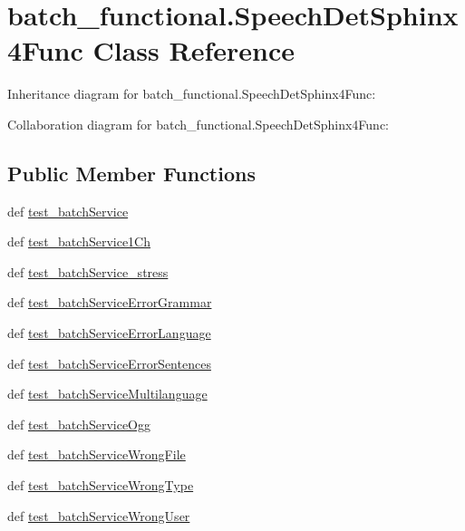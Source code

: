 \hypertarget{classbatch__functional_1_1SpeechDetSphinx4Func}{\section{batch\-\_\-functional.\-Speech\-Det\-Sphinx4\-Func Class Reference}
\label{classbatch__functional_1_1SpeechDetSphinx4Func}
}


Inheritance diagram for batch\-\_\-functional.\-Speech\-Det\-Sphinx4\-Func\-:


Collaboration diagram for batch\-\_\-functional.\-Speech\-Det\-Sphinx4\-Func\-:
\subsection*{Public Member Functions}
\begin{DoxyCompactItemize}
\item 
def \hyperlink{classbatch__functional_1_1SpeechDetSphinx4Func_a3c9455a650ec1a3d9a00633a77f8f3f5}{test\-\_\-batch\-Service}
\item 
def \hyperlink{classbatch__functional_1_1SpeechDetSphinx4Func_a316641ac7870ddb63490749b4792b590}{test\-\_\-batch\-Service1\-Ch}
\item 
def \hyperlink{classbatch__functional_1_1SpeechDetSphinx4Func_a4d12d3b504c8fc29e7c9b8e70cfeafeb}{test\-\_\-batch\-Service\-\_\-stress}
\item 
def \hyperlink{classbatch__functional_1_1SpeechDetSphinx4Func_a0c6afe405631c51df8d4a77b1dcb7948}{test\-\_\-batch\-Service\-Error\-Grammar}
\item 
def \hyperlink{classbatch__functional_1_1SpeechDetSphinx4Func_a6f945f6044e7ea87104b09ff78246c92}{test\-\_\-batch\-Service\-Error\-Language}
\item 
def \hyperlink{classbatch__functional_1_1SpeechDetSphinx4Func_addc7e5d430efa25e53a1f8b009fd3b27}{test\-\_\-batch\-Service\-Error\-Sentences}
\item 
def \hyperlink{classbatch__functional_1_1SpeechDetSphinx4Func_a60e1d7080a383403819714762985a711}{test\-\_\-batch\-Service\-Multilanguage}
\item 
def \hyperlink{classbatch__functional_1_1SpeechDetSphinx4Func_aa8ba2178adfc4b21cebbb4a6b5da150d}{test\-\_\-batch\-Service\-Ogg}
\item 
def \hyperlink{classbatch__functional_1_1SpeechDetSphinx4Func_ae2dd4750a0e80ea44031177010853800}{test\-\_\-batch\-Service\-Wrong\-File}
\item 
def \hyperlink{classbatch__functional_1_1SpeechDetSphinx4Func_a5e136352309b7a428b13ad668a4c765c}{test\-\_\-batch\-Service\-Wrong\-Type}
\item 
def \hyperlink{classbatch__functional_1_1SpeechDetSphinx4Func_ae5bbcb5d348b49172f0de8243f0dcb59}{test\-\_\-batch\-Service\-Wrong\-User}
\end{DoxyCompactItemize}


